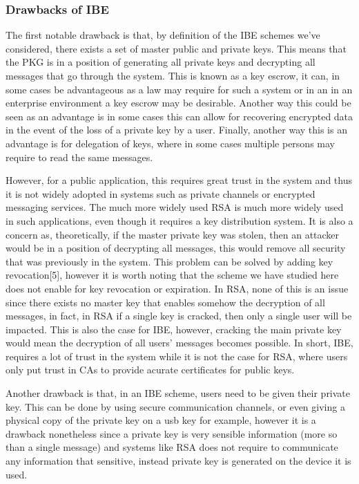 \documentclass[conference]{IEEEtran}
\begin{document}
\subsubsection{Drawbacks of IBE}
The first notable drawback is that, by definition of the 
IBE schemes we've considered, there exists a set of master
public and private keys. This means that the PKG is in a position
of generating all private keys and decrypting all messages that go through 
the system. This is known as a key escrow, it can, in some cases
be advantageous as a law may require for such a system or in an 
in an enterprise environment a key escrow may be desirable. Another
way this could be seen as an advantage is in some cases this can allow 
for recovering encrypted data in the event of the loss of a private key by a user. 
Finally, another way this is an advantage is for delegation of keys, where in some 
cases multiple persons may require to read the same messages.


However, for a public application, this requires great trust in the system 
and thus it is not widely adopted in systems such as 
private channels or encrypted messaging services. The much more 
widely used RSA is much more widely used in such applications, even though it requires
a key distribution system.
It is also a concern as, theoretically, if the master private key was stolen,
then an attacker would be in a position of decrypting all messages, this 
would remove all security that was previously in the system. This problem
can be solved by adding key revocation[5], however it is worth noting that the 
scheme we have studied here does not enable for key revocation or expiration. 
In RSA, none of this is an issue since there exists no master key that enables 
somehow the decryption of all messages, in fact, in RSA if a single key is cracked,
then only a single user will be impacted. This is also the case for IBE, however,
cracking the main private key would mean the decryption of all users' messages becomes possible.
In short, IBE, requires a lot of trust in the system while it is not 
the case for RSA, where users only put trust in CAs to provide acurate certificates for public keys.


Another drawback is that, in an IBE scheme, users need to be given their private key.
This can be done by using secure communication channels, or even giving a physical copy of the 
private key on a usb key for example, however it is a drawback nonetheless since 
a private key is very sensible information (more so than a single message) and systems 
like RSA does not require to communicate any information that sensitive, instead private key is generated on the device it is used.
\end{document}
